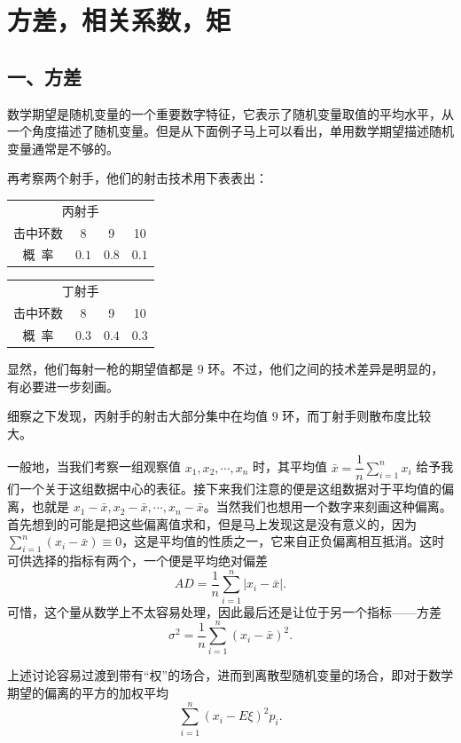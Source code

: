 \documentclass[../../main.tex]{subfiles}
\begin{document}
\section{方差，相关系数，矩}\label{section:ch04-方差相关系数矩}

\subsection*{一、方差}

数学期望是随机变量的一个重要数字特征，它表示了随机变量取值的平均水平，从一个角度描述了随机变量。但是从下面例子马上可以看出，单用数学期望描述随机变量通常是不够的。

再考察两个射手，他们的射击技术用下表表出：

\begin{center}
\begin{tabular}{c|ccc}
\multicolumn{4}{c}{丙射手}\\
击中环数 & 8 & 9 & 10\\
\hline
概\ 率 & $0.1$ & $0.8$ & $0.1$
\end{tabular}
\qquad
\begin{tabular}{c|ccc}
\multicolumn{4}{c}{丁射手}\\
击中环数 & 8 & 9 & 10\\
\hline
概\ 率 & $0.3$ & $0.4$ & $0.3$
\end{tabular}
\end{center}

显然，他们每射一枪的期望值都是 $9$ 环。不过，他们之间的技术差异是明显的，有必要进一步刻画。

细察之下发现，丙射手的射击大部分集中在均值 $9$ 环，而丁射手则散布度比较大。

一般地，当我们考察一组观察值 $x_1,x_2,\cdots,x_n$ 时，其平均值 $\bar{x}=\dfrac{1}{n}\sum_{i=1}^n x_i$ 给予我们一个关于这组数据中心的表征。接下来我们注意的便是这组数据对于平均值的偏离，也就是 $x_1-\bar{x},x_2-\bar{x},\cdots,x_n-\bar{x}$。当然我们也想用一个数字来刻画这种偏离。首先想到的可能是把这些偏离值求和，但是马上发现这是没有意义的，因为 $\sum_{i=1}^n(x_i-\bar{x})\equiv 0$，这是平均值的性质之一，它来自正负偏离相互抵消。这时可供选择的指标有两个，一个便是平均绝对偏差
\[
AD=\frac{1}{n}\sum_{i=1}^n|x_i-\bar{x}|.
\]
可惜，这个量从数学上不太容易处理，因此最后还是让位于另一个指标——方差
\[
\sigma^2=\frac{1}{n}\sum_{i=1}^n(x_i-\bar{x})^2.
\]

上述讨论容易过渡到带有``权''的场合，进而到离散型随机变量的场合，即对于数学期望的偏离的平方的加权平均
\[
\sum_{i=1}^n(x_i-E\xi)^2 p_i.
\]
\end{document}

